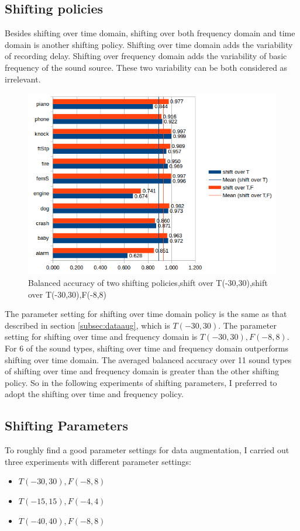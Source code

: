 \subsection{Shifting policies}
Besides shifting over time domain, shifting over both frequency domain and time domain is another shifting policy. Shifting over time domain adds the variability of recording delay. Shifting over frequency domain adds the variability of basic frequency of the sound source. These two variability can be both considered as irrelevant.
\begin{figure}[h!]
	\caption{Balanced accuracy of two shifting policies,shift over  T(-30,30),shift over T(-30,30),F(-8,8)}
	\label{fig:balcompare2}
	\centering
	\includegraphics[scale=0.9]{../image/chapter3/bal_acc_TvsF.png}
\end{figure}
The parameter setting for shifting over time domain policy is the same as that described in section \ref{subsec:dataaug}, which is $T(-30,30)$. The parameter setting for shifting over time and frequency domain is $T(-30,30),F(-8,8)$.
 For 6 of the sound types, shifting over time and frequency domain outperforms shifting over time domain. The averaged balanced accuracy over 11 sound types of shifting over time and frequency domain is greater than the other shifting policy. So in the following experiments of shifting parameters, I preferred to adopt the shifting over time and frequency policy.
 
\subsection{Shifting Parameters}
To roughly find a good parameter settings for data augmentation, I carried out three experiments with different parameter settings:
\begin{itemize}
	\item $T(-30,30),F(-8,8)$
	\item $T(-15,15),F(-4,4)$
	\item $T(-40,40),F(-8,8)$
\end{itemize}

